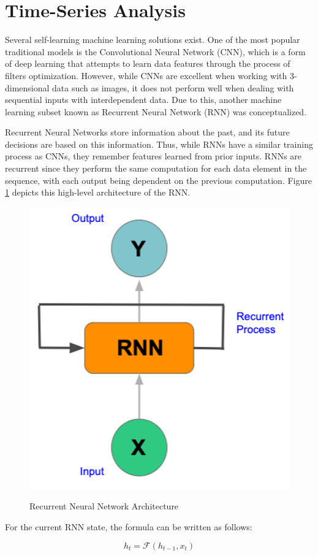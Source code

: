 \section{Time-Series Analysis}
\label{sec:ch2-time-series}

Several self-learning machine learning solutions exist. One of the most popular traditional models is the Convolutional Neural Network (CNN), which is a form of deep learning that attempts to learn data features through the process of filters optimization. However, while CNNs are excellent when working with 3-dimensional data such as images, it does not perform well when dealing with sequential inputs with interdependent data. Due to this, another machine learning subset known as Recurrent Neural Network (RNN) was conceptualized. \par

Recurrent Neural Networks store information about the past, and its future decisions are based on this information. Thus, while RNNs have a similar training process as CNNs, they remember features learned from prior inputs. RNNs are recurrent since they perform the same computation for each data element in the sequence, with each output being dependent on the previous computation. Figure \ref{fig:rnn-architecture} depicts this high-level architecture of the RNN.\par

\begin{figure}[htb]
    \centering
    \caption{Recurrent Neural Network Architecture}
    \includegraphics[width=.4\linewidth]{Figures/RNN-Overview.png}
    \label{fig:rnn-architecture}
\end{figure}


For the current RNN state, the formula can be written as follows:

\begin{equation}
    h_{t} = \mathcal{F}(h_{t-1}, x_{t})
\end{equation}

